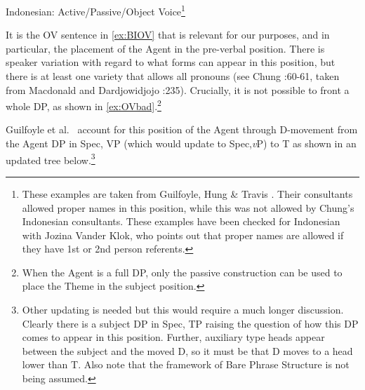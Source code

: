\documentclass[output=paper,colorlinks,citecolor=brown,
]{langscibook}
\begin{document}
\ea Indonesian: Active/Passive/Object Voice\footnote{These examples are taken from Guilfoyle, Hung \& Travis \citeyearpar{Guilfoyle:1992}.  Their consultants allowed proper names in this position, while this was not allowed by Chung's Indonesian consultants.  These examples have been checked for Indonesian with Jozina Vander Klok, who points out that proper names are allowed if they have 1st or 2nd person referents.}
    \z
\z

It is the OV sentence in \ref{ex:BIOV}  that is relevant for our purposes, and in particular, the placement of the Agent in the pre-verbal position.   There is speaker variation with regard to what forms can appear in this position, but there is at least one variety that allows all pronouns (see Chung \citeyear{Chung:1976a}:60-61, taken from  Macdonald and Dardjowidjojo \citeyear{Macdonald:1967}:235).  Crucially, it is not possible to front a whole DP, as shown in \ref{ex:OVbad}.\footnote{When the Agent is a full DP, only the passive construction can be used to place the Theme in the subject position.} 

Guilfoyle et al.\ \citeyearpar{Guilfoyle:1992} account for this position of the Agent through D-movement from the Agent DP in Spec, VP (which would update to Spec,\textit{v}P) to T as shown in an updated tree below.\footnote{Other updating is needed but this would require a much longer discussion.  Clearly there is a subject DP in Spec, TP raising the question of how this DP comes to appear in this position.  Further, auxiliary type heads appear between the subject and the moved D, so it must be that D  moves to a head lower than T. Also note that the framework of Bare Phrase Structure is not being assumed.} 
\end{document}
